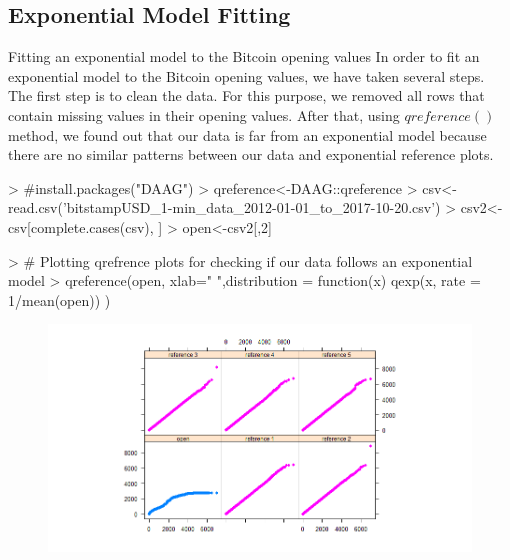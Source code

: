 \documentclass{article}
\begin{document}
\subsection{Exponential Model Fitting}
Fitting an exponential model to the Bitcoin opening values
In order to fit an exponential model to the Bitcoin opening values, we have taken several steps. The first step is to clean the data. For this purpose, we removed all rows that contain missing values in their opening values. After that, using $qreference()$ method, we found out that our data is far from an exponential model because there are no similar patterns between our data and exponential reference plots.
\begin{Schunk}
\begin{Sinput}
> #install.packages("DAAG")
> qreference<-DAAG::qreference
> csv<-read.csv('bitstampUSD_1-min_data_2012-01-01_to_2017-10-20.csv')
> csv2<-csv[complete.cases(csv), ]
> open<-csv2[,2]
\end{Sinput}
\end{Schunk}
\begin{Schunk}
\begin{Sinput}
> # Plotting qrefrence plots for checking if our data follows an exponential model
> qreference(open, xlab=" ",distribution = function(x) qexp(x, rate = 1/mean(open)) )
\end{Sinput}
\end{Schunk}
\begin{figure}
\centering
\includegraphics{qqref.png}
\end{figure}
\end{document}
